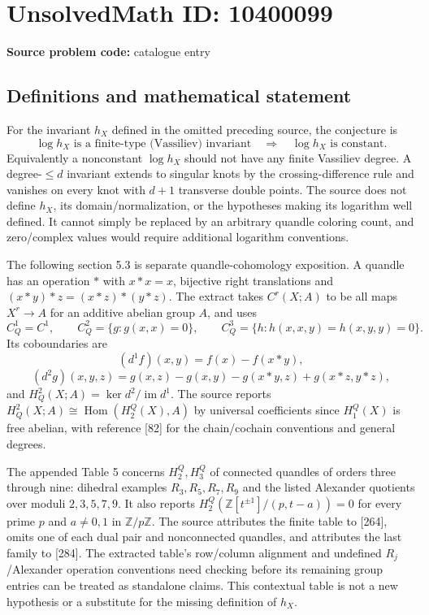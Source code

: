\documentclass[11pt]{article}
\newcommand{\Z}{\mathbb{Z}}
\begin{document}
\section*{UnsolvedMath ID: 10400099}
\textbf{Source problem code:} catalogue entry
\subsection{Definitions and mathematical statement}
For the invariant $h_X$ defined in the omitted preceding source, the conjecture is
\[
\log h_X\text{ is a finite-type (Vassiliev) invariant}
\quad\Longrightarrow\quad \log h_X\text{ is constant}.
\]
Equivalently a nonconstant $\log h_X$ should not have any finite Vassiliev degree. A degree-$\leq d$ invariant extends to singular knots by the crossing-difference rule and vanishes on every knot with $d+1$ transverse double points. The source does not define $h_X$, its domain/normalization, or the hypotheses making its logarithm well defined. It cannot simply be replaced by an arbitrary quandle coloring count, and zero/complex values would require additional logarithm conventions.

The following section 5.3 is separate quandle-cohomology exposition. A quandle has an operation $*$ with $x*x=x$, bijective right translations and $(x*y)*z=(x*z)*(y*z)$. The extract takes $C^r(X;A)$ to be all maps $X^r\to A$ for an additive abelian group $A$, and uses
\[
C_Q^1=C^1,\qquad C_Q^2=\{g:g(x,x)=0\},\qquad
C_Q^3=\{h:h(x,x,y)=h(x,y,y)=0\}.
\]
Its coboundaries are
\[
(d^1f)(x,y)=f(x)-f(x*y),
\]
\[
(d^2g)(x,y,z)=g(x,z)-g(x,y)-g(x*y,z)+g(x*z,y*z),
\]
and $H_Q^2(X;A)=\ker d^2/\operatorname{im}d^1$. The source reports $H_Q^2(X;A)\cong\operatorname{Hom}(H_2^Q(X),A)$ by universal coefficients since $H_1^Q(X)$ is free abelian, with reference [82] for the chain/cochain conventions and general degrees.

The appended Table 5 concerns $H_2^Q,H_3^Q$ of connected quandles of orders three through nine: dihedral examples $R_3,R_5,R_7,R_9$ and the listed Alexander quotients over moduli $2,3,5,7,9$. It also reports $H_2^Q(\Z[t^{\pm1}]/(p,t-a))=0$ for every prime $p$ and $a\ne0,1$ in $\Z/p\Z$. The source attributes the finite table to [264], omits one of each dual pair and nonconnected quandles, and attributes the last family to [284]. The extracted table's row/column alignment and undefined $R_j$/Alexander operation conventions need checking before its remaining group entries can be treated as standalone claims. This contextual table is not a new hypothesis or a substitute for the missing definition of $h_X$.
\end{document}
